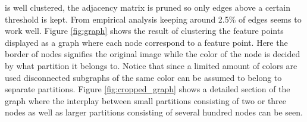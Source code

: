 \documentclass[12pt,journal,compsoc]{IEEEtran}
\begin{document}
is well clustered, the adjacency matrix is pruned so only edges above a 
certain threshold is kept. From empirical analysis keeping around 2.5\% 
of edges seems to work well. Figure \ref{fig:graph} shows the result of 
clustering the feature points displayed as a graph where each node 
correspond to a feature point. Here the border of nodes signifies the 
original image while the color of the node is decided by what partition 
it belongs to.  Notice that since a limited amount of colors are used 
disconnected subgraphs of the same color can be assumed to belong to 
separate partitions. Figure \ref{fig:cropped_graph} shows a detailed 
section of the graph where the interplay between small partitions 
consisting of two or three nodes as well as larger partitions consisting 
of several hundred nodes can be seen.
%
\begin{figure}
\end{figure}
\end{document}
